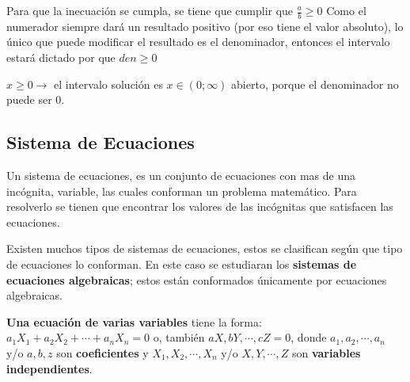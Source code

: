 \documentclass[12pt]{article}
\begin{document}
    Para que la inecuación se cumpla, se tiene que cumplir que $ \frac{a}{b} \geq 0 $
    Como el numerador siempre dará un resultado positivo (por eso tiene el valor
    absoluto), lo único que puede modificar el resultado es el denominador, entonces
    el intervalo estará dictado por que $ den \geq 0 $

    $ x\geq 0 \rightarrow$ el intervalo solución es $ x \in (0;\infty) $
    abierto, porque el denominador no puede ser 0.

    \vspace*{1cm}


\subsection{Sistema de Ecuaciones}

    Un sistema de ecuaciones, es un conjunto de ecuaciones con mas de una
    incógnita, variable, las cuales conforman un problema matemático. Para
    resolverlo se tienen que encontrar los valores de las incógnitas que satisfacen
    las ecuaciones.

    Existen muchos tipos de sistemas de ecuaciones, estos se clasifican según
    que tipo de ecuaciones lo conforman. En este caso se estudiaran los \textbf{
    sistemas de ecuaciones algebraicas}; estos están conformados únicamente por
    ecuaciones algebraicas.

    \textbf{Una ecuación de varias variables} tiene la forma:
    $ a_1X_1+a_2X_2+\cdots+a_nX_n = 0 $ o, también $aX,bY,\cdots,cZ=0$, donde
    $a_1,a_2,\cdots,a_n$ y/o $a,b,z$ son \textbf{coeficientes} y $X_1,X_2,\cdots,X_n$
    y/o $X,Y,\cdots,Z$ son \textbf{variables independientes}.
\end{document}

